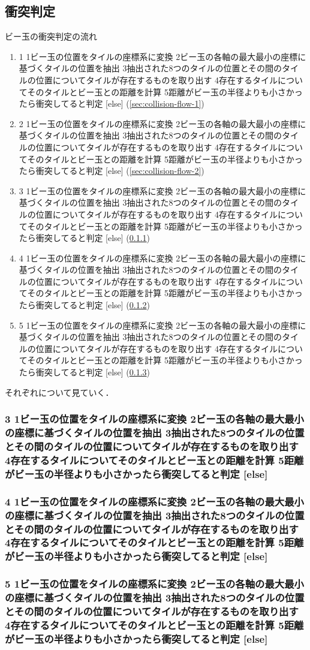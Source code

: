 
{%
\makeatletter

\newcommand{\sec@collision@flow}[1]{%
  \stringcases
    {#1}%
    {%
      {1}{ビー玉の位置をタイルの座標系に変換}%
      {2}{ビー玉の各軸の最大最小の座標に基づくタイルの位置を抽出}%
      {3}{抽出された8つのタイルの位置とその間のタイルの位置についてタイルが存在するものを取り出す}%
      {4}{存在するタイルについてそのタイルとビー玉との距離を計算}%
      {5}{距離がビー玉の半径よりも小さかったら衝突してると判定}%
    }%
    {[else]}%
}

\newcommand{\e}{\bm{e}}

\newcommand{\e@x}{\e_x}
\newcommand{\e@y}{\e_y}
\newcommand{\e@z}{\e_z}

\newcommand{\e@tile}{\e^\prime}
\newcommand{\e@tile@x}{\e@tile_x}
\newcommand{\e@tile@y}{\e@tile_y}
\newcommand{\e@tile@z}{\e@tile_z}

\newcommand{\O@tile}{{\rm O}^\prime}
\newcommand{\x@tile}{x^\prime}
\newcommand{\y@tile}{y^\prime}
\newcommand{\z@tile}{z^\prime}

\newcommand{\v@O@tile}{\bm{v}_{\O@tile}}

\newcommand{\v@P}{\bm{v}_{\rm P}}
\newcommand{\v@tile@P}{\bm{v}^\prime_{\rm P}}
\subsection{衝突判定}

\begin{center}
  
\end{center}

ビー玉の衝突判定の流れ

\begin{enumerate}
  \item \sec@collision@flow{1} (\ref{sec:collision-flow-1})
  \item \sec@collision@flow{2} (\ref{sec:collision-flow-2})
  \item \sec@collision@flow{3} (\ref{sec:collision-flow-3})
  \item \sec@collision@flow{4} (\ref{sec:collision-flow-4})
  \item \sec@collision@flow{5} (\ref{sec:collision-flow-5})
\end{enumerate}

それぞれについて見ていく．






\subsubsection{\sec@collision@flow{3}}
\label{sec:collision-flow-3}

\subsubsection{\sec@collision@flow{4}}
\label{sec:collision-flow-4}

\subsubsection{\sec@collision@flow{5}}
\label{sec:collision-flow-5}

\makeatother
}
